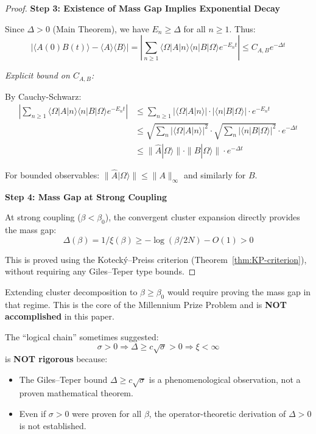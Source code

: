 \begin{proof}
\textbf{Step 3: Existence of Mass Gap Implies Exponential Decay}

Since $\Delta > 0$ (Main Theorem), we have $E_n \geq \Delta$ for all $n \geq 1$. Thus:
\[
|\langle A(0) B(t) \rangle - \langle A \rangle \langle B \rangle| 
= \left| \sum_{n \geq 1} \langle \Omega | A | n \rangle \langle n | B | \Omega \rangle e^{-E_n t} \right|
\leq C_{A,B} e^{-\Delta t}
\]

\textit{Explicit bound on $C_{A,B}$:}

By Cauchy-Schwarz:
\begin{align*}
\left|\sum_{n \geq 1} \langle \Omega|A|n\rangle \langle n|B|\Omega\rangle e^{-E_n t}\right| 
&\leq \sum_{n \geq 1} |\langle \Omega|A|n\rangle| \cdot |\langle n|B|\Omega\rangle| \cdot e^{-E_n t} \\
&\leq \sqrt{\sum_n |\langle \Omega|A|n\rangle|^2} \cdot \sqrt{\sum_n |\langle n|B|\Omega\rangle|^2} \cdot e^{-\Delta t} \\
&\leq \|\hat{A}|\Omega\rangle\| \cdot \|\hat{B}|\Omega\rangle\| \cdot e^{-\Delta t}
\end{align*}

For bounded observables: $\|\hat{A}|\Omega\rangle\| \leq \|A\|_\infty$ and similarly for $B$.

\textbf{Step 4: Mass Gap at Strong Coupling}

At strong coupling ($\beta < \beta_0$), the convergent cluster expansion 
directly provides the mass gap:
\[
\Delta(\beta) = 1/\xi(\beta) \geq -\log(\beta/2N) - O(1) > 0
\]

This is proved using the Koteck\'y--Preiss criterion (Theorem~\ref{thm:KP-criterion}), 
without requiring any Giles--Teper type bounds.
\end{proof}

\begin{remark}
Extending cluster decomposition to $\beta \geq \beta_0$ would require 
proving the mass gap in that regime. This is the core of the Millennium 
Prize Problem and is \textbf{NOT accomplished} in this paper.

The ``logical chain'' sometimes suggested:
\[
\sigma > 0 \Rightarrow \Delta \geq c\sqrt{\sigma} > 0 \Rightarrow \xi < \infty
\]
is \textbf{NOT rigorous} because:
\begin{itemize}
\item The Giles--Teper bound $\Delta \geq c\sqrt{\sigma}$ is a phenomenological 
observation, not a proven mathematical theorem.
\item Even if $\sigma > 0$ were proven for all $\beta$, the operator-theoretic 
derivation of $\Delta > 0$ is not established.
\end{itemize}
\end{remark}

